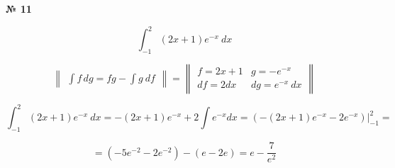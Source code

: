 \documentclass{article}
\begin{document}
\textbf{№ 11} 
\large

$$ \int_{-1}^{2} (2x+1)e^{-x} \ dx $$

$$ \begin{Vmatrix} \int f \,dg = fg - \int g \ df \end{Vmatrix} =
   \begin{Vmatrix} f = 2x+1 &  g = -e^{-x} \\
                  df = 2dx  & dg = e^{-x} \ dx \end{Vmatrix} $$

$$  \int_{-1}^{2} (2x+1)e^{-x} \ dx
= -(2x+1)e^{-x} + 2\int e^{-x} dx 
= \left( -(2x+1)e^{-x} - 2e^{-x} \right) \bigg\vert_{-1}^{2}
= $$

$$ = \left( -5e^{-2} - 2e^{-2} \right) - \left( e - 2e \right)
= e - \frac{7}{e^2}$$
\end{document}
